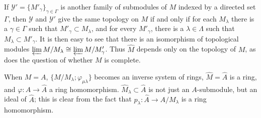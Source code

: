 If $\mathcal{Y}' = \{M'_\gamma\}_{\gamma \in \Gamma}$ is another family of submodules of $M$ indexed by a
directed set $\Gamma$, then $\mathcal{Y}$ and $\mathcal{Y}'$ give the same topology on $M$ if and only if for
each $M_\lambda$ there is a $\gamma \in \Gamma$ such that $M'_\gamma \subset M_\lambda$, and for every $M'_\gamma$, there is a $\lambda \in \Lambda$
such that $M_\lambda \subset M'_\gamma$. It is then easy to see that there is an isomorphism of
topological modules $\varprojlim M/M_\lambda \cong \varprojlim M/M'_\gamma$. Thus $\hat{M}$ depends only on
the topology of $M$, as does the question of whether $M$ is complete.

When $M = A$, $\{M/M_\lambda; \varphi_{\mu\lambda}\}$ becomes an inverse system of rings, $\hat{M} = \hat{A}$
is a ring, and $\varphi\colon A \to \hat{A}$ a ring homomorphism. $\hat{M}_\lambda \subset \hat{A}$ is not just
an $A$-submodule, but an ideal of $\hat{A}$; this is clear from the fact that
$p_\lambda\colon \hat{A} \to A/M_\lambda$ is a ring homomorphism.

